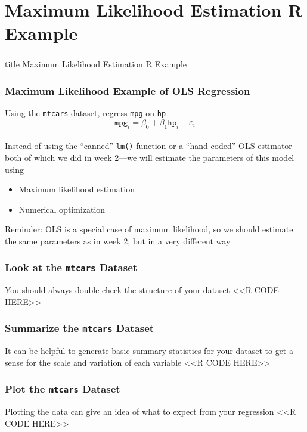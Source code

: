 \documentclass{beamer}
\begin{document}
\section{Maximum Likelihood Estimation R Example}
\label{example}
\begin{frame}\frametitle{}
    \vfill
    \centering
    \begin{beamercolorbox}[center]{title}
        \Large Maximum Likelihood Estimation R Example
    \end{beamercolorbox}
    \vfill
\end{frame}

\begin{frame}\frametitle{Maximum Likelihood Example of OLS Regression}
    Using the \texttt{mtcars} dataset, regress \texttt{mpg} on \texttt{hp}
    $$\texttt{mpg}_i = \beta_0 + \beta_1 \texttt{hp}_i + \varepsilon_i$$ \\
    \vspace{3ex}
    Instead of using the ``canned'' \texttt{lm()} function or a ``hand-coded'' OLS estimator---both of which we did in week 2---we will estimate the parameters of this model using
    \begin{itemize}
        \item Maximum likelihood estimation
        \item Numerical optimization
    \end{itemize}
    \vspace{3ex}
    Reminder: OLS is a special case of maximum likelihood, so we should estimate the same parameters as in week 2, but in a very different way
\end{frame}

\begin{frame}[fragile]\frametitle{Look at the \texttt{mtcars} Dataset}
    You should always double-check the structure of your dataset
    <<R CODE HERE>>
\end{frame}

\begin{frame}[fragile]\frametitle{Summarize the \texttt{mtcars} Dataset}
    It can be helpful to generate basic summary statistics for your dataset to get a sense for the scale and variation of each variable
    <<R CODE HERE>>
\end{frame}

\begin{frame}[fragile]\frametitle{Plot the \texttt{mtcars} Dataset}
    Plotting the data can give an idea of what to expect from your regression
    <<R CODE HERE>>
\end{frame}
\end{document}
